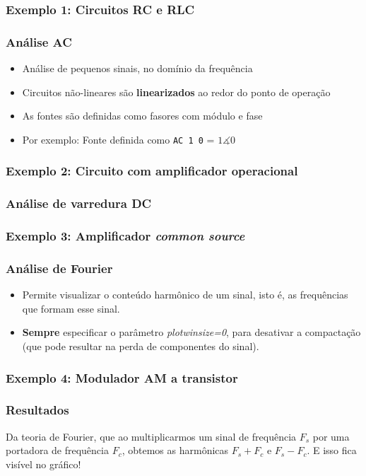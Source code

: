 \documentclass{beamer}
\begin{document}
\begin{frame}
\frametitle{Exemplo 1: Circuitos RC e RLC}
\end{frame}

\begin{frame}
\frametitle{Análise AC}
\begin{itemize}
\item{Análise de pequenos sinais, no domínio da frequência}
\item{Circuitos não-lineares são \textbf{linearizados} ao redor do ponto de operação}

\item{As fontes são definidas como fasores com módulo e fase}
\item{Por exemplo: Fonte definida como \texttt{AC 1 0} = $1\measuredangle 0$} 
\end{itemize}
\end{frame}

\begin{frame}
\frametitle{Exemplo 2: Circuito com amplificador operacional}
\end{frame}

\begin{frame}
\frametitle{Análise de varredura DC}
\end{frame}

\begin{frame}
\frametitle{Exemplo 3: Amplificador \textit{common source}}
\end{frame}

\begin{frame}
\frametitle{Análise de Fourier}
\begin{itemize}
\item Permite visualizar o conteúdo harmônico de um sinal, isto é, as frequências que formam esse sinal.
\item \textbf{Sempre} especificar o parâmetro \textit{plotwinsize=0}, para desativar a compactação (que pode resultar na perda de componentes do sinal).
\end{itemize}
\end{frame}

\begin{frame}
\frametitle{Exemplo 4: Modulador AM a transistor}
\end{frame}

\begin{frame}
\frametitle{Resultados}
Da teoria de Fourier, que ao multiplicarmos um sinal de frequência $F_s$ por uma portadora de frequência $F_c$, obtemos as harmônicas $F_s + F_c$ e $F_s - F_c$. E isso fica visível no gráfico!
\end{frame}
\end{document}
